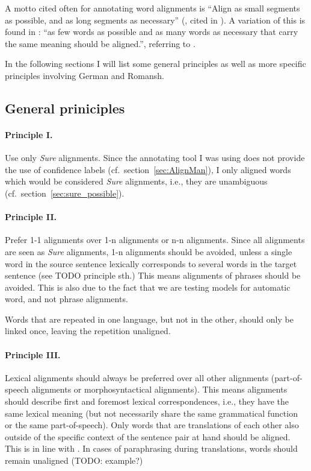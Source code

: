 A motto cited often for annotating word alignments is \enquote{Align as small segments as possible, and as long segments as necessary} (\cite{Vronis00evaluationof}, cited in \cite{lines2007}). A variation of this is found in \cite{clematide2018}: \enquote{as few words as possible and as many words as necessary that carry the same meaning should be aligned.}, referring to \cite{lambert2005}. 

In the following sections I will list some general principles as well as more specific principles involving German and Romansh.

\subsection{General priniciples}
\label{sec:gold-principles}
\paragraph{Principle I.} 
Use only \emph{Sure} alignments. 
Since the annotating tool I was using does not provide the use of confidence labels (cf.~section~\ref{sec:AlignMan}), I only aligned words which would be considered \emph{Sure} alignments, i.e., they are unambiguous (cf.~section~\ref{sec:sure_possible}). 


\paragraph{Principle II.}
Prefer 1-1 alignments over 1-n alignments or n-n alignments. 
Since all alignments are seen as \emph{Sure} alignments, 1-n alignments should be avoided, unless a single word in the source sentence lexically corresponds to several words in the target sentence (see TODO principle sth.)
This means alignments of phrases should be avoided. This is also due to the fact that we are testing models for automatic word, and not phrase alignments.


Words that are repeated in one language, but not in the other, should only be linked once, leaving the repetition unaligned.

\paragraph{Principle III.}
Lexical alignments should always be preferred over all other alignments (part-of-speech alignments or morphosyntactical alignments). 
This means alignments should describe first and foremost lexical correspondences, i.e., they have the same lexical meaning (but not necessarily share the same grammatical function or the same part-of-speech).
Only words that are translations of each other also outside of the specific context of the sentence pair at hand should be aligned. This is in line with \cite{clematide2018}.
In cases of paraphrasing during translations, words should remain unaligned (TODO: example?)

